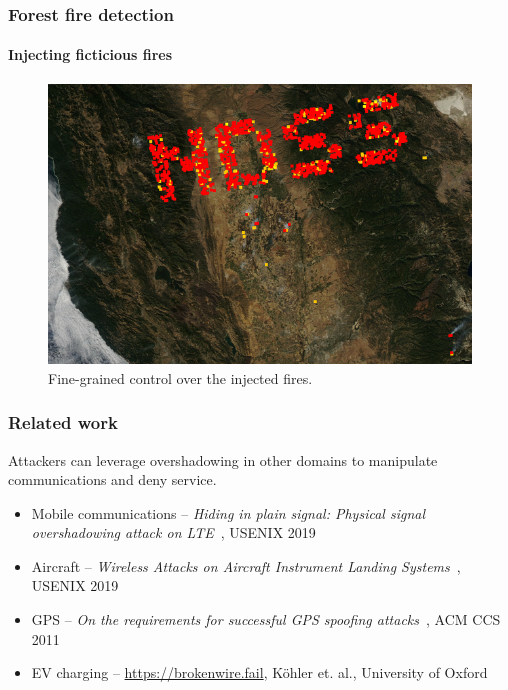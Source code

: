 \documentclass{beamer}
\begin{document}
\begin{frame}
  \frametitle{Forest fire detection}
  \framesubtitle{Injecting ficticious fires}

  \begin{figure}
    \includegraphics[width=\textwidth]{images/injection/pixels_800_140.jpg}
    \caption{Fine-grained control over the injected fires.}
    \label{fig:injection-location}
  \end{figure}
\end{frame}



\begin{frame}
  \frametitle{Related work}
  Attackers can leverage overshadowing in other domains to manipulate communications and deny service.
  \begin{itemize}[<+->]
    \item Mobile communications -- \textit{Hiding in plain signal: Physical signal overshadowing attack on LTE}~\cite{yang2019hiding}, USENIX 2019
    \item Aircraft -- \textit{Wireless Attacks on Aircraft Instrument Landing Systems}~\cite{sathayeWireless2019}, USENIX 2019
    \item GPS -- \textit{On the requirements for successful GPS spoofing attacks}~\cite{tippenhauer2011requirements}, ACM CCS 2011
    \item EV charging -- \url{https://brokenwire.fail}, K{\"o}hler et. al., University of Oxford
  \end{itemize}
\end{frame}
\end{document}
